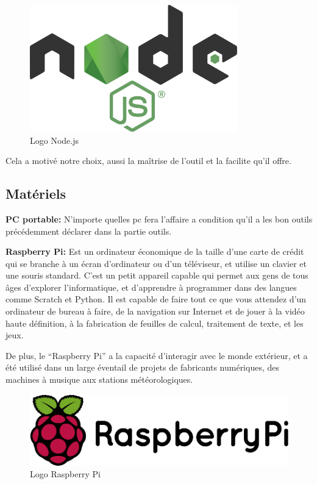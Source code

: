 \documentclass[12pt]{article}
\begin{document}
\begin{figure}[h]
	\centering
	\includegraphics[width=9cm]{img-Chapiter-4/nodejs.png}
	\caption{Logo Node.js}
\end{figure}

Cela a motivé notre choix, aussi la maîtrise de l’outil et la facilite qu'il offre.
\subsection{Matériels}
\textbf{PC portable:} N’importe quelles pc fera l’affaire a condition qu’il a les bon outils précédemment déclarer dans la partie outils.

\textbf{Raspberry Pi:} Est un ordinateur économique de la taille d’une carte de crédit qui se branche à un écran d’ordinateur ou d’un téléviseur, et utilise un clavier et une souris standard. C’est un petit appareil capable qui permet aux gens de tous âges d’explorer l’informatique, et d’apprendre à programmer dans des langues comme Scratch et Python. Il est capable de faire tout ce que vous attendez d’un ordinateur de bureau à faire, de la navigation sur Internet et de jouer à la vidéo haute définition, à la fabrication de feuilles de calcul, traitement de texte, et les jeux.


De plus, le “Raspberry Pi” a la capacité d’interagir avec le monde extérieur, et a été utilisé dans un large éventail de projets de fabricants numériques, des machines à musique aux stations météorologiques.

\begin{figure}[h]
	\centering
	\includegraphics[width=12cm]{img-Chapiter-4/raspberry.png}
	\caption{Logo Raspberry Pi}
\end{figure}
\end{document}
